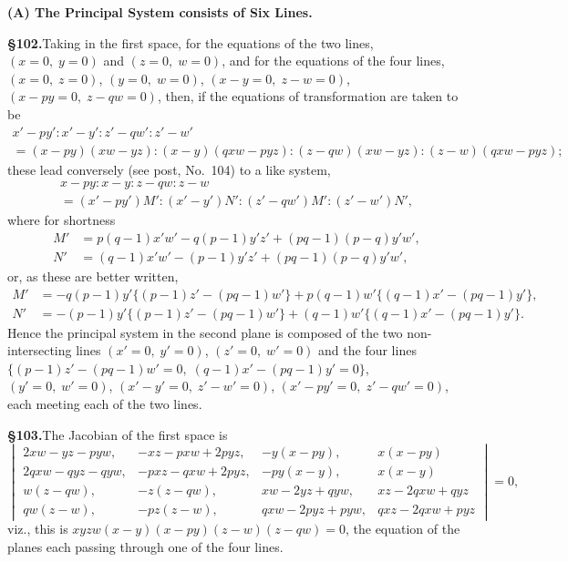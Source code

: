 \documentclass[11pt,a4paper]{article}
\begin{document}
\textbf{(A) The Principal System consists of Six Lines.}

\textbf{\S 102.}\quad Taking in the first space, for the equations of the two lines, $(x = 0,\; y = 0)$ and $(z = 0,\; w = 0)$, and for the equations of the four lines, $(x = 0,\; z = 0)$, $(y = 0,\; w = 0)$, $(x - y = 0,\; z - w = 0)$, $(x - py = 0,\; z - qw = 0)$, then, if the equations of transformation are taken to be
\begin{multline*}
x' - py' : x' - y' : z' - qw' : z' - w' \\
= (x - py)(xw - yz) : (x - y)(qxw - pyz) : (z - qw)(xw - yz) : (z - w)(qxw - pyz);
\end{multline*}
these lead conversely (see post, No.~104) to a like system,
\begin{multline*}
x - py : x - y : z - qw : z - w \\
= (x' - py')M' : (x' - y')N' : (z' - qw')M' : (z' - w')N',
\end{multline*}
where for shortness
\begin{align*}
M' &= p(q - 1)x'w' - q(p - 1)y'z' + (pq - 1)(p - q)y'w', \\
N' &= (q - 1)x'w' - (p - 1)y'z' + (pq - 1)(p - q)y'w',
\end{align*}
or, as these are better written,
\begin{align*}
M' &= -q(p - 1)y'\{(p - 1)z' - (pq - 1)w'\} + p(q - 1)w'\{(q - 1)x' - (pq - 1)y'\}, \\
N' &= -(p - 1)y'\{(p - 1)z' - (pq - 1)w'\} + (q - 1)w'\{(q - 1)x' - (pq - 1)y'\}.
\end{align*}
Hence the principal system in the second plane is composed of the two non-intersecting lines $(x' = 0,\; y' = 0)$, $(z' = 0,\; w' = 0)$ and the four lines $\{(p - 1)z' - (pq - 1)w' = 0,\; (q - 1)x' - (pq - 1)y' = 0\}$, $(y' = 0,\; w' = 0)$, $(x' - y' = 0,\; z' - w' = 0)$, $(x' - py' = 0,\; z' - qw' = 0)$, each meeting each of the two lines.

\textbf{\S 103.}\quad The Jacobian of the first space is
\[
\begin{vmatrix}
2xw - yz - pyw, & -xz - pxw + 2pyz, & -y(x - py), & x(x - py) \\
2qxw - qyz - qyw, & -pxz - qxw + 2pyz, & -py(x - y), & x(x - y) \\
w(z - qw), & -z(z - qw), & xw - 2yz + qyw, & xz - 2qxw + qyz \\
qw(z - w), & -pz(z - w), & qxw - 2pyz + pyw, & qxz - 2qxw + pyz
\end{vmatrix} = 0,
\]
viz., this is $xyzw(x - y)(x - py)(z - w)(z - qw) = 0$, the equation of the planes each passing through one of the four lines.
\end{document}
